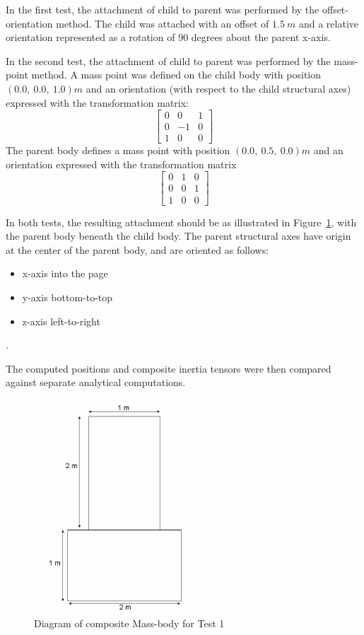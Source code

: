 \begin{description}
In the first test, the attachment of child to parent was performed by the 
offset-orientation method.  
The child was attached with an offset of $1.5 ~m$ and a 
relative orientation represented as a rotation of 90 degrees about the parent 
x-axis.

In the second test, the attachment of child to parent was performed by the 
mass-point method. A mass point was defined on the child body with position 
$(0.0, ~0.0,~1.0) m$ 
and an orientation (with respect to the child structural axes) expressed with 
the transformation matrix: 
\begin{equation*}
\begin{bmatrix} 0 & 0 & 1 \\ 0 & -1 & 0 \\ 1 & 0 & 0 \end{bmatrix}
\end{equation*}
The parent body defines a mass point with position  $(0.0, ~0.5, ~0.0) m$ and 
an orientation expressed with the transformation matrix 
\begin{equation*}
 \begin{bmatrix} 0 & 1 
& 0 \\ 0 & 0 & 1 \\ 1 & 0 & 0 \end{bmatrix}
\end{equation*}

In both tests, the resulting attachment should be as illustrated in 
Figure~\ref{two_rect}, with the parent body beneath the child body.  
The parent structural axes have origin at the center of the parent body, and 
are oriented as follows:
\begin{itemize}
 \item x-axis into the page
 \item y-axis bottom-to-top
 \item z-axis left-to-right
\end{itemize}
.

The computed positions and composite inertia tensors were then compared 
against separate analytical computations.

\begin{figure}[h]
\begin{center}
\includegraphics[height=80mm]{pics/two_rect.jpg} 
\caption{Diagram of composite Mass-body for Test 1}
\label{two_rect}
\end{center}
\end{figure}



\end{description}
